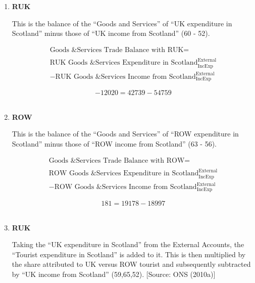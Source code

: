 \begin{enumerate}
\item \textbf {RUK}

This is the balance of the “Goods and Services” of “UK expenditure in Scotland” minus those of “UK income from Scotland” (60 - 52).

\begin{equation}
\begin{split}
\text{Goods \& Services Trade Balance with RUK} =  \\ \\ 
\text{RUK Goods \& Services Expenditure in Scotland}^\text{External}_\text{IncExp}\\
-\text{RUK Goods \& Services Income from Scotland}^\text{External}_\text{IncExp}
\end{split} \label{eq:2.5.71}
\end{equation}

\begin{equation} \nonumber
-12020 = 42739-54759
\end{equation}\\


\item \textbf {ROW}

This is the balance of the “Goods and Services” of “ROW expenditure in Scotland” minus those of “ROW income from Scotland” (63 - 56).

\begin{equation}
\begin{split}
\text{Goods \& Services Trade Balance with ROW} =  \\ \\ 
\text{ROW Goods \& Services Expenditure in Scotland}^\text{External}_\text{IncExp}\\
-\text{ROW Goods \& Services Income from Scotland}^\text{External}_\text{IncExp}
\end{split} \label{eq:2.5.72}
\end{equation}

\begin{equation} \nonumber
181 = 19178-18997
\end{equation}\\



\pagebreak

\item \textbf {RUK}

Taking the “UK expenditure in Scotland” from the External Accounts, the “Tourist expenditure in Scotland” is added to it. This is then multiplied by the share attributed to UK versus ROW tourist and subsequently subtracted by “UK income from Scotland” (59,65,52). [Source: ONS (2010a)]\\


\end{enumerate}
